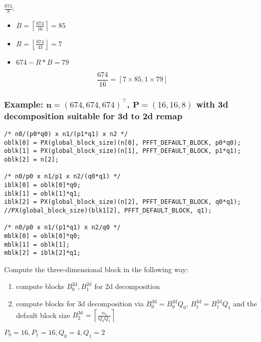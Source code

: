 $\frac{674}{8}$:
\begin{itemize}
 \item $B = \left\lceil \frac{674}{16} \right\rceil = 85$
 \item $R = \left\lfloor \frac{674}{43} \right\rfloor = 7$
 \item $674 - R*B = 79$
\end{itemize}
\begin{equation*}
  \frac{674}{16} = \left[7\times 85, 1\times 79 \right]
\end{equation*}

\subsubsection{Example: $\mathbf n=(674, 674, 674)^\top$, $\mathbf P = (16,16,8)$ with 3d decomposition suitable for 3d to 2d remap}

\begin{lstlisting}
/* n0/(p0*q0) x n1/(p1*q1) x n2 */
oblk[0] = PX(global_block_size)(n[0], PFFT_DEFAULT_BLOCK, p0*q0);
oblk[1] = PX(global_block_size)(n[1], PFFT_DEFAULT_BLOCK, p1*q1);
oblk[2] = n[2];

/* n0/p0 x n1/p1 x n2/(q0*q1) */
iblk[0] = oblk[0]*q0;
iblk[1] = oblk[1]*q1;
iblk[2] = PX(global_block_size)(n[2], PFFT_DEFAULT_BLOCK, q0*q1);
//PX(global_block_size)(blk1[2], PFFT_DEFAULT_BLOCK, q1);

/* n0/p0 x n1/(p1*q1) x n2/q0 */
mblk[0] = oblk[0]*q0;
mblk[1] = oblk[1];
mblk[2] = iblk[2]*q1;
\end{lstlisting}

Compute the three-dimensional block in the following way:
\begin{enumerate}
 \item compute blocks $B_0^\textrm{2d}, B_1^\textrm{2d}$ for 2d decomposition
 \item compute blocks for 3d decomposition via $B_0^\textrm{3d} = B_0^\textrm{2d} Q_0$, $B_1^\textrm{3d} = B_1^\textrm{2d} Q_1$ and the default block size $B_2^\textrm{3d} = \left\lceil\frac{n_2}{Q_0Q_1}\right\rceil$
\end{enumerate}


$P_0 = 16, P_1 = 16, Q_0=4, Q_1=2$

